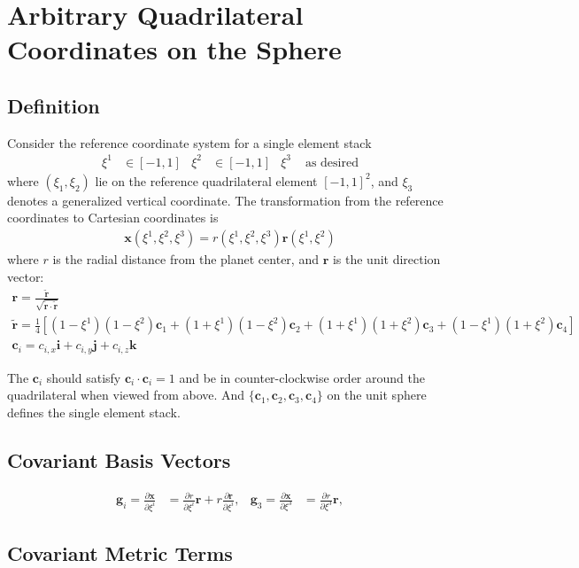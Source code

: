 \documentclass{report}
\newcommand{\vb}{\mathbf}
\newcommand{\pdiff}[2]{\frac{\partial #1}{\partial #2}}
\begin{document}
\section{Arbitrary Quadrilateral Coordinates on the Sphere}

\subsection{Definition}
Consider the reference coordinate system for a single element stack
\begin{align}
\xi^1 &\in [-1,1] & \xi^2 &\in [-1,1] & \xi^3 & \mbox{\ as desired}
\end{align}
where $(\xi_1, \xi_2)$ lie on the reference quadrilateral element $ [-1,1]^2$, and $\xi_3$ denotes a generalized vertical coordinate. The transformation from the reference coordinates to Cartesian coordinates is
\begin{align}\label{eq:phys-to-ref-sphere}
\vb{x}(\xi^1,\xi^2,\xi^3) = r(\xi^1,\xi^2,\xi^3) \vb{r}(\xi^1,\xi^2)
\end{align}
where $r$ is the radial distance from the planet center, and $\vb{r}$ is the unit direction vector:
\begin{align}
\label{eq:vbr-sphere}
\mathbf{r}=\frac{\widetilde{\mathbf{r}}}{\sqrt{\widetilde{\vb{r}} \cdot \widetilde{\vb{r}}}}\\
\widetilde{\vb{r}}=\frac{1}{4} \left[ (1-\xi^1)(1-\xi^2) \vb{c}_1+(1+\xi^1)(1-\xi^2) \vb{c}_2+(1+\xi^1)(1+\xi^2) \vb{c}_3+(1-\xi^1)(1+\xi^2) \vb{c}_4 \right]\\
\vb{c}_i = c_{i,x} \vb{i} + c_{i,y} \vb{j} + c_{i,z} \vb{k}
\end{align}

The $\vb{c}_i$ should satisfy $\vb{c}_i \cdot \vb{c}_i = 1$ and be in counter-clockwise order around the quadrilateral when viewed from above.
And $\{\vb{c}_1, \vb{c}_2, \vb{c}_3, \vb{c}_4\}$ on the unit sphere defines the single element stack.

\subsection{Covariant Basis Vectors}

\begin{align}
\vb{g}_{i} = \pdiff{\vb{x}}{\xi^i} &= \pdiff{r}{\xi^i} \vb{r} + r \pdiff{\vb{r}}{\xi^i}, & \vb{g}_3 = \pdiff{\vb{x}}{\xi^3} &= \pdiff{r}{\xi^3} \vb{r},
\end{align}

\subsection{Covariant Metric Terms}
\end{document}
